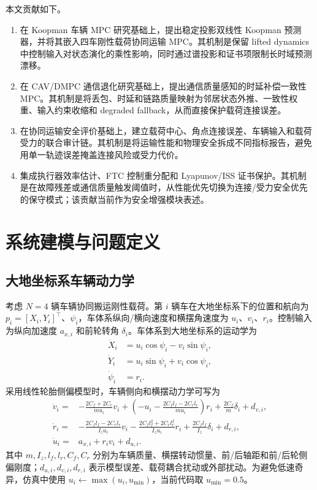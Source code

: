 \documentclass[twocolumn,3p,times,procedia]{elsarticle}
\begin{document}
本文贡献如下。

\begin{enumerate}
\item 在 Koopman 车辆 MPC 研究基础上，提出稳定投影双线性 Koopman 预测器，并将其嵌入四车刚性载荷协同运输 MPC。其机制是保留 lifted dynamics 中控制输入对状态演化的乘性影响，同时通过谱投影和证书项限制长时域预测漂移。
\item 在 CAV/DMPC 通信退化研究基础上，提出通信质量感知的时延补偿一致性 MPC。其机制是将丢包、时延和链路质量映射为邻居状态外推、一致性权重、输入约束收缩和 degraded fallback，从而直接保护载荷连接误差。
\item 在协同运输安全评价基础上，建立载荷中心、角点连接误差、车辆输入和载荷受力的联合审计链。其机制是将运输性能和物理安全拆成不同指标报告，避免用单一轨迹误差掩盖连接风险或受力代价。
\item 集成执行器效率估计、FTC 控制重分配和 Lyapunov/ISS 证书保护。其机制是在故障残差或通信质量触发阈值时，从性能优先切换为连接/受力安全优先的保守模式；该贡献当前作为安全增强模块表述。
\end{enumerate}

\section{系统建模与问题定义}

\subsection{大地坐标系车辆动力学}

考虑 $N=4$ 辆车辆协同搬运刚性载荷。第 $i$ 辆车在大地坐标系下的位置和航向为
$p_i=[X_i,Y_i]^\top$、$\psi_i$，车体系纵向/横向速度和横摆角速度为 $u_i$、$v_i$、$r_i$。控制输入为纵向加速度 $a_{x,i}$ 和前轮转角 $\delta_i$。车体系到大地坐标系的运动学为
\begin{equation}
\begin{aligned}
\dot X_i &= u_i\cos\psi_i-v_i\sin\psi_i,\\
\dot Y_i &= u_i\sin\psi_i+v_i\cos\psi_i,\\
\dot \psi_i &= r_i .
\end{aligned}
\label{eq:world_kinematics}
\end{equation}
采用线性轮胎侧偏模型时，车辆侧向和横摆动力学可写为
\begin{equation}
\begin{aligned}
\dot v_i=&-\frac{2C_f+2C_r}{m u_i}v_i+
\left(-u_i-\frac{2C_f l_f-2C_r l_r}{m u_i}\right)r_i
+\frac{2C_f}{m}\delta_i+d_{v,i},\\
\dot r_i=&-\frac{2C_f l_f-2C_r l_r}{I_z u_i}v_i
-\frac{2C_f l_f^2+2C_r l_r^2}{I_z u_i}r_i
+\frac{2C_f l_f}{I_z}\delta_i+d_{r,i},\\
\dot u_i=&a_{x,i}+r_i v_i+d_{u,i}.
\end{aligned}
\label{eq:bicycle_dynamics}
\end{equation}
其中 $m,I_z,l_f,l_r,C_f,C_r$ 分别为车辆质量、横摆转动惯量、前/后轴距和前/后轮侧偏刚度；$d_{u,i},d_{v,i},d_{r,i}$ 表示模型误差、载荷耦合扰动或外部扰动。为避免低速奇异，仿真中使用 $u_i\leftarrow\max(u_i,u_{\min})$，当前代码取 $u_{\min}=0.5$。
\end{document}
